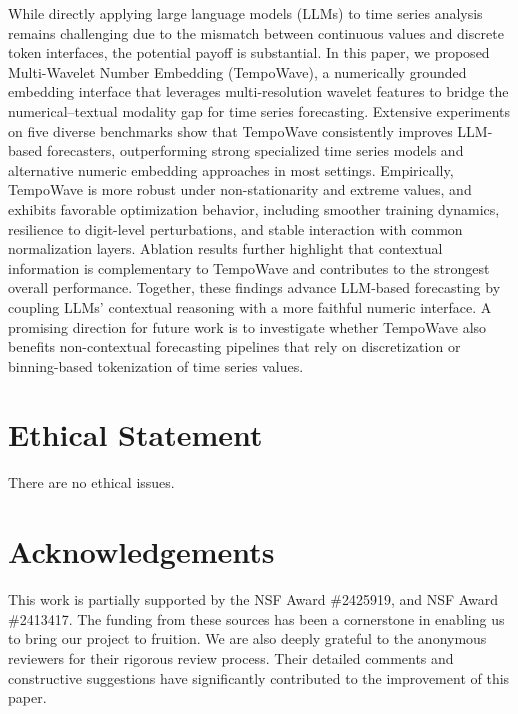 \documentclass{article}
\begin{document}
While directly applying large language models (LLMs) to time series analysis remains challenging due to the mismatch between continuous values and discrete token interfaces, the potential payoff is substantial. In this paper, we proposed {Multi-Wavelet Number Embedding (TempoWave)}, a numerically grounded embedding interface that leverages multi-resolution wavelet features to bridge the numerical--textual modality gap for time series forecasting. Extensive experiments on five diverse benchmarks show that TempoWave consistently improves LLM-based forecasters, outperforming strong specialized time series models and alternative numeric embedding approaches in most settings. Empirically, TempoWave is more robust under non-stationarity and extreme values, and exhibits favorable optimization behavior, including smoother training dynamics, resilience to digit-level perturbations, and stable interaction with common normalization layers. Ablation results further highlight that contextual information is complementary to TempoWave and contributes to the strongest overall performance. Together, these findings advance LLM-based forecasting by coupling LLMs' contextual reasoning with a more faithful numeric interface. A promising direction for future work is to investigate whether TempoWave also benefits non-contextual forecasting pipelines that rely on discretization or binning-based tokenization of time series values.









\newpage
\section*{Ethical Statement}

There are no ethical issues.


\section*{Acknowledgements}

This work is partially supported by the NSF Award \#2425919, and NSF Award \#2413417. The funding from these sources has been a cornerstone in enabling us to bring our project to fruition. We are also deeply grateful to the anonymous reviewers for their rigorous review process. Their detailed comments and constructive suggestions have significantly contributed to the improvement of this paper. 






%
\end{document}
